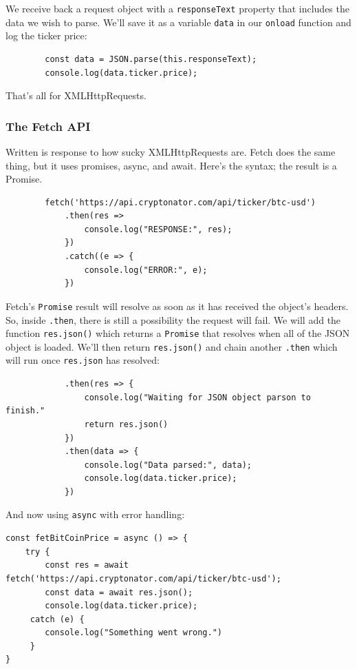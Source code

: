 \documentclass[11pt, letterpaper]{article}
\begin{document}
We receive back a request object with a \verb+responseText+  property that includes the data we wish to parse. We'll save
it as a variable \verb+data+ in our \verb+onload+ function and log the ticker price:

{\small
    \begin{verbatim}
        const data = JSON.parse(this.responseText);
        console.log(data.ticker.price);
    \end{verbatim}
}

That's all for XMLHttpRequests.

\subsubsection{The Fetch API}

Written is response to how sucky XMLHttpRequests are. Fetch does the same thing, but it uses promises, async, and
await. Here's the syntax; the result is a Promise.

{\small
    \begin{verbatim}
        fetch('https://api.cryptonator.com/api/ticker/btc-usd')
            .then(res =>
                console.log("RESPONSE:", res);
            })
            .catch((e => {
                console.log("ERROR:", e);
            })
    \end{verbatim}
}

Fetch's \verb+Promise+ result will resolve as soon as it has received the object's headers. So, inside \verb+.then+,
there is still a possibility the request will fail. We will add the function \verb+res.json()+ which returns 
a \verb+Promise+ that resolves when all of the JSON object is loaded. We'll then return \verb+res.json()+ and chain
another \verb+.then+ which will run once \verb+res.json+ has resolved:

\begin{verbatim}
            .then(res => {
                console.log("Waiting for JSON object parson to finish."
                return res.json()
            })
            .then(data => {
                console.log("Data parsed:", data);
                console.log(data.ticker.price);
            })
\end{verbatim}

And now using \verb+async+ with error handling:

{\small
\begin{verbatim}
const fetBitCoinPrice = async () => {
    try {
        const res = await fetch('https://api.cryptonator.com/api/ticker/btc-usd');
        const data = await res.json();
        console.log(data.ticker.price);
     catch (e) {
        console.log("Something went wrong.")
     }
}
\end{verbatim}
}
\end{document}
